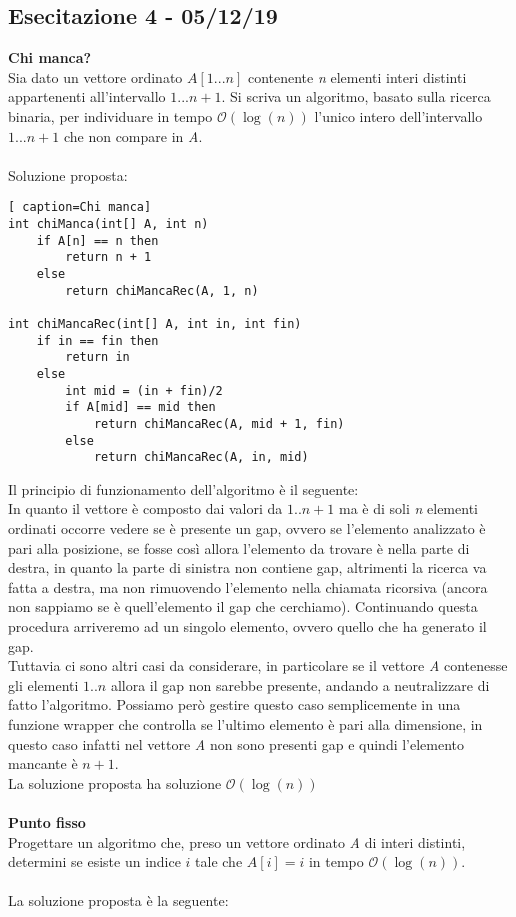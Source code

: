 \documentclass[../cheatSheetAlgoritmi.tex]{subfiles}
\begin{document}
\subsection{Esecitazione 4 - 05/12/19}
\textbf{Chi manca?} \\
Sia dato un vettore ordinato $A[1...n]$ contenente \textit{n} elementi interi distinti appartenenti all’intervallo $1...n+1$. Si scriva un algoritmo, basato sulla ricerca binaria, per individuare in tempo $\mathcal{O}(\log(n))$ l’unico intero dell’intervallo $1...n+1$ che non compare in \textit{A}.
\\\\
Soluzione proposta:
\begin{lstlisting}[ caption=Chi manca]
int chiManca(int[] A, int n)
	if A[n] == n then
		return n + 1
	else	
		return chiMancaRec(A, 1, n)

int chiMancaRec(int[] A, int in, int fin)
	if in == fin then 
  		return in
  	else
    	int mid = (in + fin)/2
    	if A[mid] == mid then 
      		return chiMancaRec(A, mid + 1, fin)
    	else
      		return chiMancaRec(A, in, mid)
\end{lstlisting}
Il principio di funzionamento dell'algoritmo è il seguente: \\
In quanto il vettore è composto dai valori da $1..n+1$ ma è di soli \textit{n} elementi ordinati occorre vedere se è presente un gap, ovvero se l'elemento analizzato è pari alla posizione, se fosse così allora l'elemento da trovare è nella parte di destra, in quanto la parte di sinistra non contiene gap, altrimenti la ricerca va fatta a destra, ma non rimuovendo l'elemento nella chiamata ricorsiva (ancora non sappiamo se è quell'elemento il gap che cerchiamo). Continuando questa procedura arriveremo ad un singolo elemento, ovvero quello che ha generato il gap.\\
Tuttavia ci sono altri casi da considerare, in particolare se il vettore \textit{A} contenesse gli elementi $1..n$ allora il gap non sarebbe presente, andando a neutralizzare di fatto l'algoritmo. Possiamo però gestire questo caso semplicemente in una funzione wrapper che controlla se l'ultimo elemento è pari alla dimensione, in questo caso infatti nel vettore \textit{A} non sono presenti gap e quindi l'elemento mancante è $n + 1$. \\
La soluzione proposta ha soluzione $\mathcal{O}(\log(n))$
\\\\
\textbf{Punto fisso} \\
Progettare un algoritmo che, preso un vettore ordinato \textit{A} di interi distinti, determini se esiste un indice $i$ tale che $A[i] = i$ in tempo $\mathcal{O}(\log(n))$.\\\\
La soluzione proposta è la seguente:
\newpage
\end{document}
